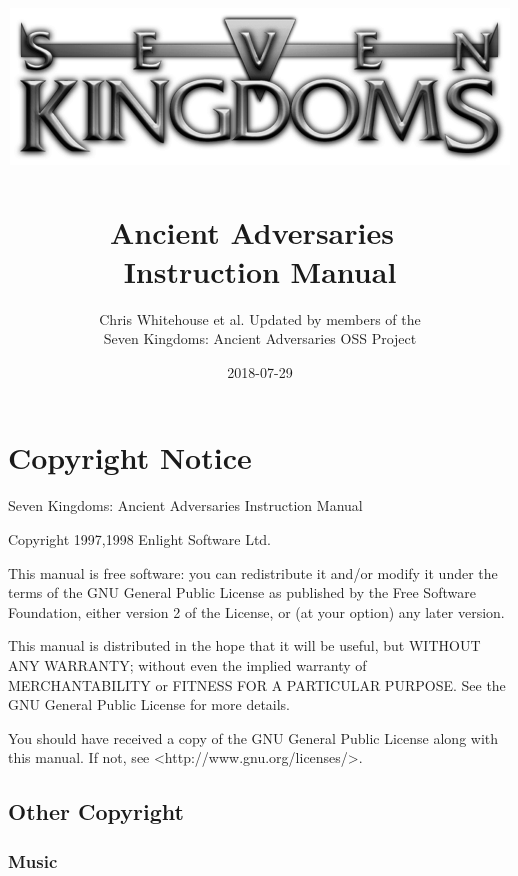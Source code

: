 \documentclass[openany]{book}
\begin{document}
\title{
\includegraphics[width=0.9\linewidth]{7klogo}~\\[1cm]
{\Huge{\textbf{Ancient Adversaries}}}~\\[1cm]
{\huge{\textbf{Instruction Manual}}}
}
\author{Chris Whitehouse et al. Updated by members of the \\
Seven Kingdoms: Ancient Adversaries OSS Project} %
\date{2018-07-29} %

\frontmatter
\maketitle

\section*{Copyright Notice}

Seven Kingdoms: Ancient Adversaries Instruction Manual

Copyright 1997,1998 Enlight Software Ltd.

This manual is free software: you can redistribute it and/or modify it under the terms of the GNU General Public License as published by the Free Software Foundation, either version 2 of the License, or (at your option) any later version.

This manual is distributed in the hope that it will be useful, but WITHOUT ANY WARRANTY; without even the implied warranty of MERCHANTABILITY or FITNESS FOR A PARTICULAR PURPOSE.  See the GNU General Public License for more details.

You should have received a copy of the GNU General Public License along with this manual.  If not, see <http://www.gnu.org/licenses/>.

\subsection*{Other Copyright}

\subsubsection*{Music}
\end{document}
